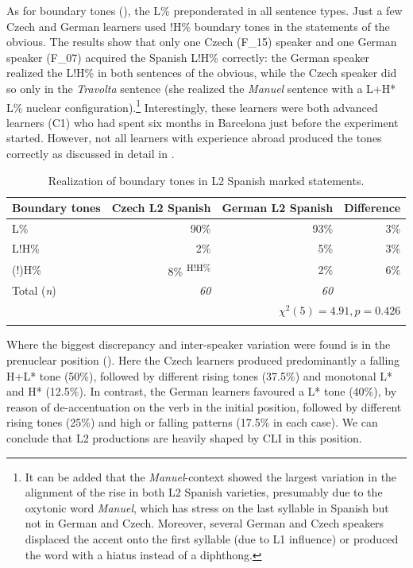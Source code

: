As for boundary tones (), the L\% preponderated in all sentence types. Just a few Czech and German learners used !H\% boundary tones in the statements of the obvious. The results show that only one Czech (F\_15) speaker and one German speaker (F\_07) acquired the Spanish L!H\% correctly: the German speaker realized the L!H\% in both sentences of the obvious, while the Czech speaker did so only in the \textit{Travolta}{} sentence (she realized the \textit{Manuel}{} sentence with a L+H* L\% nuclear configuration).\footnote{It can be added that the \textit{Manuel}{}-context showed the largest variation in the alignment of the rise in both L2 Spanish varieties, presumably due to the oxytonic word \textit{Manuel}, which has stress on the last syllable in Spanish but not in German and Czech. Moreover, several German and Czech speakers displaced the accent onto the first syllable (due to L1 influence) or produced the word with a hiatus instead of a diphthong.} Interestingly, these learners were both advanced learners (C1) who had spent six months in Barcelona just before the experiment started. However, not all learners with experience abroad produced the tones correctly as discussed in detail in \citet{Pešková2022b}.

\begin{table}
\begin{tabularx}{\textwidth}{Qrrr}

\lsptoprule

{Boundary tones} & {Czech L2 Spanish} & {German L2 Spanish} & {Difference}\\
\midrule
L\% &  90\% &  93\% &  3\%\\
L!H\% &  2\% &  5\% &  3\%\\
(!)H\% &  8\% \textsuperscript{H!H\%} &  2\% &  6\%\\
\midrule
Total (\textit{n}) & {\itshape 60} & {\itshape 60} &  \\
\\
\lspbottomrule
\end{tabularx}

\caption{Realization of boundary tones in L2 Spanish marked statements.}
\label{tab:4.12}
\end{table}

Where the biggest discrepancy and inter-speaker variation were found is in the prenuclear position (). Here the Czech learners produced predominantly a falling H+L* tone (50\%), followed by different rising tones (37.5\%) and monotonal L* and H* (12.5\%). In contrast, the German learners favoured a L* tone (40\%), by reason of de-accentuation on the verb in the initial position, followed by different rising tones (25\%) and high or falling patterns (17.5\% in each case). We can conclude that L2 productions are heavily shaped by CLI in this position.

